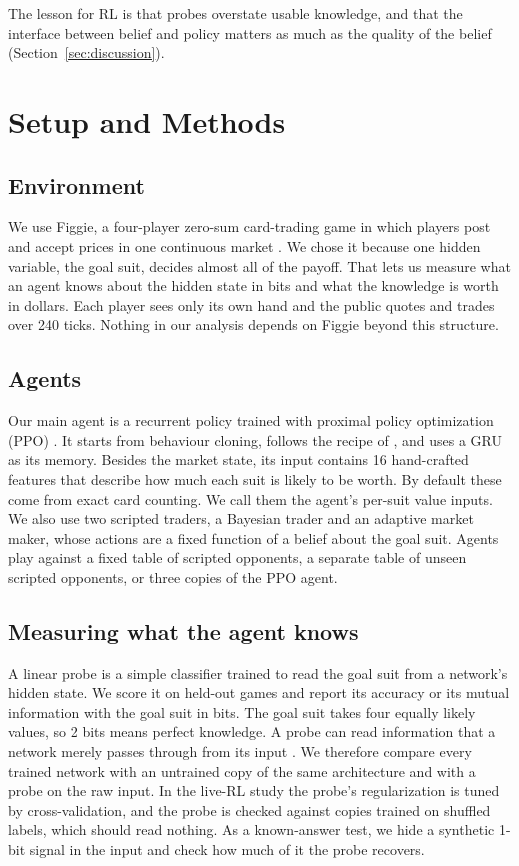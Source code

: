\documentclass{article}
\begin{document}
The lesson for RL is that probes overstate usable knowledge, and that the interface between belief and policy matters as much as the quality of the belief (Section~\ref{sec:discussion}).


\section{Setup and Methods}
\label{sec:setup}

\subsection{Environment}
We use Figgie, a four-player zero-sum card-trading game in which players post and accept prices in one continuous market \cite{disilvio2025figgie,cs224r2025figgie}. We chose it because one hidden variable, the goal suit, decides almost all of the payoff. That lets us measure what an agent knows about the hidden state in bits and what the knowledge is worth in dollars. Each player sees only its own hand and the public quotes and trades over 240 ticks. Nothing in our analysis depends on Figgie beyond this structure.

\subsection{Agents}
Our main agent is a recurrent policy trained with proximal policy optimization (PPO) \cite{schulman2017ppo}. It starts from behaviour cloning, follows the recipe of \cite{cs224r2025figgie}, and uses a GRU as its memory. Besides the market state, its input contains 16 hand-crafted features that describe how much each suit is likely to be worth. By default these come from exact card counting. We call them the agent's per-suit value inputs. We also use two scripted traders, a Bayesian trader and an adaptive market maker, whose actions are a fixed function of a belief about the goal suit. Agents play against a fixed table of scripted opponents, a separate table of unseen scripted opponents, or three copies of the PPO agent.

\subsection{Measuring what the agent knows}
A linear probe is a simple classifier trained to read the goal suit from a network's hidden state. We score it on held-out games and report its accuracy or its mutual information with the goal suit in bits. The goal suit takes four equally likely values, so 2 bits means perfect knowledge. A probe can read information that a network merely passes through from its input \cite{hewitt2019control}. We therefore compare every trained network with an untrained copy of the same architecture and with a probe on the raw input. In the live-RL study the probe's regularization is tuned by cross-validation, and the probe is checked against copies trained on shuffled labels, which should read nothing. As a known-answer test, we hide a synthetic 1-bit signal in the input and check how much of it the probe recovers.
\end{document}
